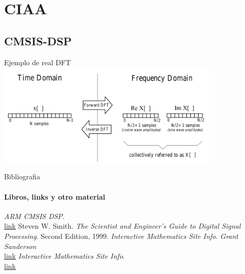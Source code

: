  \section{CIAA}
 \subsection{CMSIS-DSP}
 \begin{frame}{}{Ejemplo de real DFT}
    \handsonicon
    \center\includegraphics[width=0.8\textwidth]{3_clase/real_dft_idft}
    \vfill
 \end{frame}
\begin{frame}{Bibliografia}
   \framesubtitle{Libros, links y otro material}
   \begin{thebibliography}{9}
         \emph{ARM CMSIS DSP}. \\
         \href {https://arm-software.github.io/CMSIS_5/DSP/html/index.html}{link}
         Steven W. Smith.
         \emph{The Scientist and Engineer's Guide to Digital Signal Processing}.
         Second Edition, 1999.
         \emph{Interactive Mathematics Site Info}.
         \emph{Grant Sanderson} \\
         \href{ https://youtu.be/spUNpyF58BY}{link}
            \emph{Interactive Mathematics Site Info}. \\
            \href {https://www.intmath.com/fourier-series/fourier-intro.php}{link}
   \end{thebibliography}
\end{frame}


